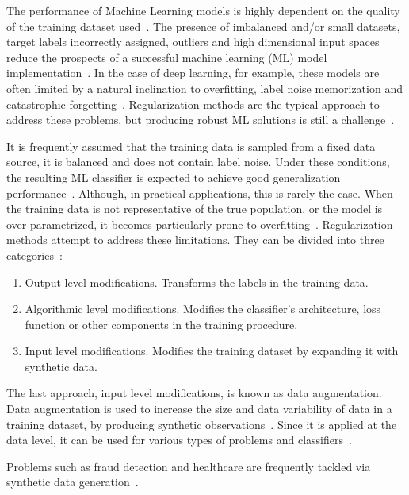 \documentclass[parskip=full]{scrartcl}
\begin{document}
The performance of Machine Learning models is highly dependent on the quality
of the training dataset used~\cite{Fenza2021, Halevy2009}. The presence of
imbalanced and/or small datasets, target labels incorrectly assigned, outliers
and high dimensional input spaces reduce the prospects of a successful machine
learning (ML) model implementation~\cite{Halevy2009, Domingos2012,
Salman2019}. In the case of deep learning, for example, these
models are often limited by a natural inclination to overfitting, label noise
memorization and catastrophic forgetting~\cite{Xie2021}. Regularization
methods are the typical approach to address these problems, but producing
robust ML solutions is still a challenge~\cite{Zhang2021}.

It is frequently assumed that the training data is sampled from a fixed data
source, it is balanced and does not contain label noise. Under these
conditions, the resulting ML classifier is expected to achieve good
generalization performance~\cite{benning2018modern}. Although, in practical
applications, this is rarely the case. When the training data is not
representative of the true population, or the model is over-parametrized, it
becomes particularly prone to overfitting~\cite{Bartlett2021}. Regularization
methods attempt to address these limitations. They can be divided into three
categories~\cite{santos2022avoiding}:

\begin{enumerate}
    \item Output level modifications. Transforms the labels in the training
        data.
    \item Algorithmic level modifications. Modifies the classifier's
        architecture, loss function or other components in the training
        procedure.
    \item Input level modifications. Modifies the training dataset by expanding it
        with synthetic data.
\end{enumerate}

The last approach, input level modifications, is known as data augmentation.
Data augmentation is used to increase the size and data variability of data in
a training dataset, by producing synthetic observations~\cite{Van2001,
Wong2016}. Since it is applied at the data level, it can be used for various
types of problems and classifiers~\cite{Behpour2019}. 

Problems such as fraud detection and healthcare are frequently tackled via
synthetic data generation~\cite{ekbatani2017synthetic}.
\end{document}
